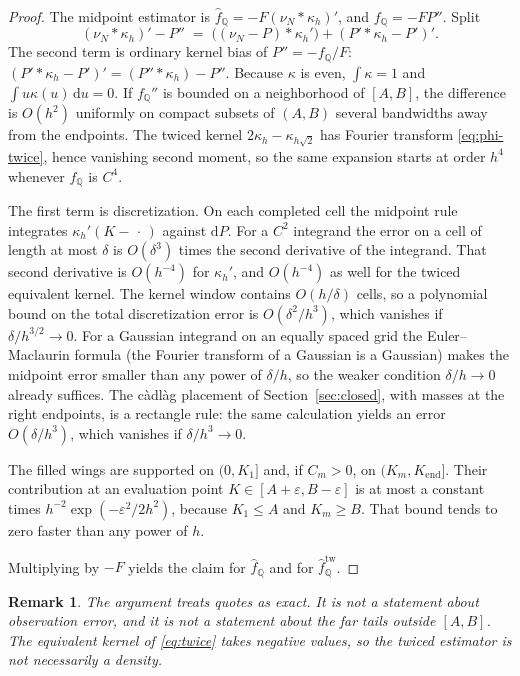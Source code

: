 \documentclass[preprint,12pt,authoryear,times]{elsarticle}
\newtheorem{remark}{Remark}
\newcommand{\Q}{\mathbb{Q}}
\begin{document}
\begin{proof}
The midpoint estimator is \(\hat f_{\Q}=-F(\nu_N\ast\kappa_h)'\), and \(f_{\Q}=-F P''\). Split
\[
(\nu_N\ast\kappa_h)'-P''
\;=\;
\bigl((\nu_N-P)\ast\kappa_h'\bigr)
+(P'\ast\kappa_h-P')'.
\]
The second term is ordinary kernel bias of \(P''=-f_{\Q}/F\): \((P'\ast\kappa_h-P')'=(P''\ast\kappa_h)-P''\). Because \(\kappa\) is even, \(\int\kappa=1\) and \(\int u\kappa(u)\,\mathrm{d}u=0\). If \(f_{\Q}''\) is bounded on a neighborhood of \([A,B]\), the difference is \(O(h^2)\) uniformly on compact subsets of \((A,B)\) several bandwidths away from the endpoints. The twiced kernel \(2\kappa_h-\kappa_{h\sqrt{2}}\) has Fourier transform \eqref{eq:phi-twice}, hence vanishing second moment, so the same expansion starts at order \(h^4\) whenever \(f_{\Q}\) is \(C^4\).

The first term is discretization. On each completed cell the midpoint rule integrates \(\kappa_h'(K-\,\cdot\,)\) against \(\mathrm{d}P\). For a \(C^2\) integrand the error on a cell of length at most \(\delta\) is \(O(\delta^3)\) times the second derivative of the integrand. That second derivative is \(O(h^{-4})\) for \(\kappa_h'\), and \(O(h^{-4})\) as well for the twiced equivalent kernel. The kernel window contains \(O(h/\delta)\) cells, so a polynomial bound on the total discretization error is \(O(\delta^2/h^3)\), which vanishes if \(\delta/h^{3/2}\to 0\). For a Gaussian integrand on an equally spaced grid the Euler--Maclaurin formula (the Fourier transform of a Gaussian is a Gaussian) makes the midpoint error smaller than any power of \(\delta/h\), so the weaker condition \(\delta/h\to 0\) already suffices. The c\`adl\`ag placement of Section~\ref{sec:closed}, with masses at the right endpoints, is a rectangle rule: the same calculation yields an error \(O(\delta/h^3)\), which vanishes if \(\delta/h^3\to 0\).

The filled wings are supported on \((0,K_1]\) and, if \(C_m>0\), on \((K_m,K_{\mathrm{end}}]\). Their contribution at an evaluation point \(K\in[A+\varepsilon,B-\varepsilon]\) is at most a constant times \(h^{-2}\exp(-\varepsilon^2/2h^2)\), because \(K_1\le A\) and \(K_m\ge B\). That bound tends to zero faster than any power of \(h\).

Multiplying by \(-F\) yields the claim for \(\hat f_{\Q}\) and for \(\hat f_{\Q}^{\mathrm{tw}}\).
\end{proof}

\begin{remark}
The argument treats quotes as exact. It is not a statement about observation error, and it is not a statement about the far tails outside \([A,B]\). The equivalent kernel of \eqref{eq:twice} takes negative values, so the twiced estimator is not necessarily a density.
\end{remark}
\end{document}
